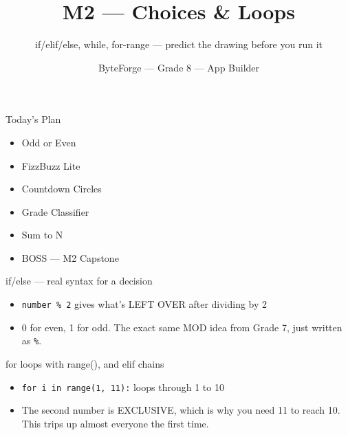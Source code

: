 \documentclass[aspectratio=169]{beamer}
\title{M2 — Choices \& Loops}
\subtitle{if/elif/else, while, for-range — predict the drawing before you run it}
\author{ByteForge --- Grade 8 --- App Builder}
\date{}
\begin{document}
\begin{frame}
    \titlepage
\end{frame}

\begin{frame}{Today's Plan}
    \begin{itemize}
        \item Odd or Even
        \item FizzBuzz Lite
        \item Countdown Circles
        \item Grade Classifier
        \item Sum to N
        \item[$\bigstar$] BOSS --- M2 Capstone
    \end{itemize}
\end{frame}

\begin{frame}{if/else — real syntax for a decision}
    \large
    \begin{itemize}
        \item \texttt{number \% 2} gives what's LEFT OVER after dividing by 2
        \item 0 for even, 1 for odd. The exact same MOD idea from Grade 7, just written as \texttt{\%}.
    \end{itemize}

    \begin{center}
    \end{center}
\end{frame}


\begin{frame}{for loops with range(), and elif chains}
    \large
    \begin{itemize}
        \item \texttt{for i in range(1, 11):} loops through 1 to 10
        \item The second number is EXCLUSIVE, which is why you need 11 to reach 10. This trips up almost everyone the first time.
    \end{itemize}
\end{frame}
\end{document}
